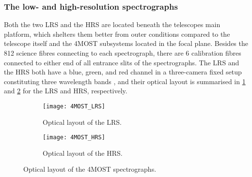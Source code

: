 \documentclass[a4paper,11pt]{article}
\begin{document}
\subsubsection{The low- and high-resolution spectrographs} \label{spectrographs}
Both the two LRS and the HRS are located beneath the telescopes main platform, which shelters them better from outer conditions compared to the telescope itself and the 4MOST subsystems located in the focal plane. Besides the 812 science fibres connecting to each spectrograph, there are 6 calibration fibres connected to either end of all entrance slits of the spectrographs. The LRS and the HRS both have a blue, green, and red channel in a three-camera fixed setup constituting three wavelength bands \citep{4most16}, and their optical layout is summarised in \ref{fig:lrs_layout} and \ref{fig:hrs_layout} for the LRS and HRS, respectively.
%
\begin{figure}
 \centering
 \begin{minipage}[c]{0.5\textwidth}
 \begin{subfigure}[b]{\linewidth}
  \centering
  \texttt{[image: 4MOST\_LRS]}
  \caption{Optical layout of the LRS.}
  \label{fig:lrs_layout}
 \end{subfigure}
 \end{minipage}\hfill
 \begin{minipage}[c]{0.5\textwidth}
 \begin{subfigure}[b]{\linewidth}
  \centering
  \texttt{[image: 4MOST\_HRS]}
  \caption{Optical layout of the HRS.}
  \label{fig:hrs_layout}
 \end{subfigure}
 \end{minipage}
 \caption[Optical layout of the 4MOST spectrographs]{Optical layout of the 4MOST spectrographs.\footnotemark}
 \label{fig:opt_layout}
\end{figure}
\\ \\
%
\end{document}
